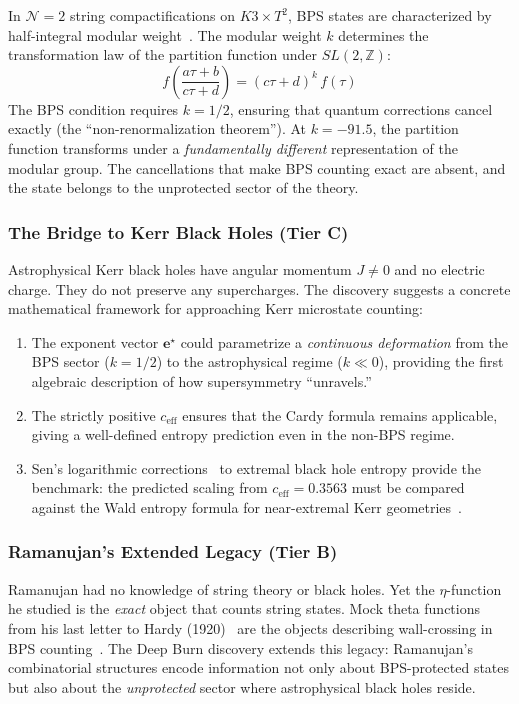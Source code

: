 \documentclass[11pt,a4paper]{article}
\theoremstyle{plain}
\theoremstyle{definition}
\theoremstyle{remark}
\newcommand{\tierB}{\textbf{Tier B}}
\newcommand{\tierC}{\textbf{Tier C}}
\begin{document}
In $\mathcal{N} = 2$ string compactifications on $K3 \times T^2$, BPS
states are characterized by half-integral modular
weight~\cite{EOT2011,GPPV2020}. The modular weight $k$ determines the
transformation law of the partition function under $SL(2, \mathbb{Z})$:
\[
  f\!\left(\frac{a\tau + b}{c\tau + d}\right)
  = (c\tau + d)^k \, f(\tau)
\]
The BPS condition requires $k = 1/2$, ensuring that quantum corrections
cancel exactly (the ``non-renormalization theorem''). At $k = -91.5$, the
partition function transforms under a \emph{fundamentally different}
representation of the modular group. The cancellations that make BPS
counting exact are absent, and the state belongs to the unprotected sector
of the theory.

\subsubsection{The Bridge to Kerr Black Holes (\tierC{})}

Astrophysical Kerr black holes have angular momentum $J \neq 0$ and no
electric charge. They do not preserve any supercharges. The discovery
suggests a concrete mathematical framework for approaching Kerr microstate
counting:

\begin{enumerate}
  \item The exponent vector $\mathbf{e}^\star$ could parametrize a
  \emph{continuous deformation} from the BPS sector ($k = 1/2$) to the
  astrophysical regime ($k \ll 0$), providing the first algebraic
  description of how supersymmetry ``unravels.''
  \item The strictly positive $c_{\mathrm{eff}}$ ensures that the Cardy
  formula remains applicable, giving a well-defined entropy prediction
  even in the non-BPS regime.
  \item Sen's logarithmic corrections~\cite{Sen2012} to extremal black
  hole entropy provide the benchmark: the predicted scaling from
  $c_{\mathrm{eff}} = 0.3563$ must be compared against the Wald entropy
  formula for near-extremal Kerr geometries~\cite{Wald1993}.
\end{enumerate}

\subsubsection{Ramanujan's Extended Legacy (\tierB{})}

Ramanujan had no knowledge of string theory or black holes. Yet the
$\eta$-function he studied is the \emph{exact} object that counts string
states. Mock theta functions from his last letter to Hardy
(1920)~\cite{Narosa1988} are the objects describing wall-crossing in BPS
counting~\cite{Zwegers2002}. The Deep Burn discovery extends this legacy:
Ramanujan's combinatorial structures encode information not only about
BPS-protected states but also about the \emph{unprotected} sector where
astrophysical black holes reside.
\end{document}
